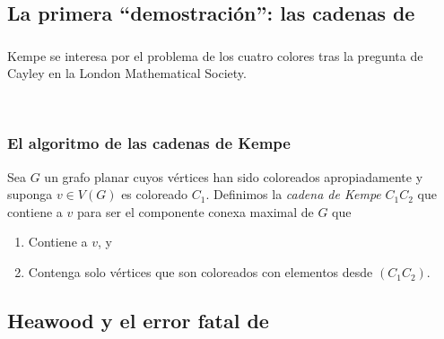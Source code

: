 \documentclass[spanish, utf8,handout]{beamer} %
\theoremstyle{definition}
\begin{document}
\subsection{La primera ``demostración'': las cadenas de \citeauthor{kempe}}

\begin{frame}\transblindsvertical
\frametitle{\insertsubsection}

Kempe se interesa por el problema de los cuatro colores tras la pregunta de Cayley en la London Mathematical Society.

\


\end{frame}

\begin{frame}
\frametitle{El algoritmo de las cadenas de Kempe}

\begin{definition}
Sea $G$ un grafo planar cuyos vértices han sido coloreados apropiadamente y suponga $v\in V(G)$ es coloreado $C_1$. Definimos la \emph{cadena de Kempe} $C_1C_2$ que contiene a $v$ para ser el componente conexa maximal de $G$ que
\begin{enumerate}%
	\item Contiene a $v$, y
	\item Contenga solo vértices que son coloreados con elementos desde $(C_1C_2)$.
\end{enumerate}
\end{definition}
\end{frame}

\subsection{Heawood y el error fatal de \citeauthor{kempe}}
\end{document}
